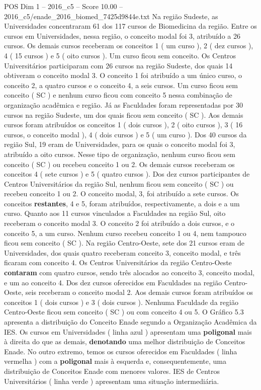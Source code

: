 \begin{textsample}{POS Dim 1 – 2016\_c5 – Score 10.00 – 2016\_c5/enade\_2016\_biomed\_7425d9844e.txt}
Na região Sudeste, as Universidades concentraram 61 dos 117 cursos de Biomedicina da região.
Entre os cursos em Universidades, nessa região, o conceito modal foi 3, atribuído a 26 cursos.
Os demais cursos receberam os conceitos 1 ( um curso ), 2 ( dez cursos ), 4 ( 15 cursos ) e 5 ( oito cursos ).
Um curso ficou sem conceito.
Os Centros Universitários participaram com 26 cursos na região Sudeste, dos quais 14 obtiveram o conceito modal 3.
O conceito 1 foi atribuído a um único curso, o conceito 2, a quatro cursos e o conceito 4, a seis cursos.
Um curso ficou sem conceito ( SC ) e nenhum curso ficou com conceito 5 nessa combinação de organização acadêmica e região.
Já as Faculdades foram representadas por 30 cursos na região Sudeste, um dos quais ficou sem conceito ( SC ).
Aos demais cursos foram atribuídos os conceitos 1 ( dois cursos ), 2 ( oito cursos ), 3 ( 16 cursos, o conceito modal ), 4 ( dois cursos ) e 5 ( um curso ).
Dos 40 cursos da região Sul, 19 eram de Universidades, para os quais o conceito modal foi 3, atribuído a oito cursos.
Nesse tipo de organização, nenhum curso ficou sem conceito ( SC ) ou recebeu conceito 1 ou 2.
Os demais cursos receberam os conceitos 4 ( sete cursos ) e 5 ( quatro cursos ).
Dos dez cursos participantes de Centros Universitários da região Sul, nenhum ficou sem conceito ( SC ) ou recebeu conceito 1 ou 2.
O conceito modal, 3, foi atribuído a sete cursos.
Os conceitos \textbf{restantes}, 4 e 5, foram atribuídos, respectivamente, a dois e a um curso.
Quanto aos 11 cursos vinculados a Faculdades na região Sul, oito receberam o conceito modal 3.
O conceito 2 foi atribuído a dois cursos, e o conceito 5, a um curso.
Nenhum curso recebeu conceito 1 ou 4, nem tampouco ficou sem conceito ( SC ).
Na região Centro-Oeste, sete dos 21 cursos eram de Universidades, dos quais quatro receberam conceito 3, conceito modal, e três ficaram com conceito 4.
Os Centros Universitários da região Centro-Oeste \textbf{contaram} com quatro cursos, sendo três alocados ao conceito 3, conceito modal, e um ao conceito 4.
Dos dez cursos oferecidos em Faculdades na região Centro-Oeste, seis receberam o conceito modal 2.
Aos demais cursos foram atribuídos os conceitos 1 ( dois cursos ) e 3 ( dois cursos ).
Nenhuma Faculdade da região Centro-Oeste ficou sem conceito ( SC ) ou com conceito 4 ou 5.
O Gráfico 5.3 apresenta a distribuição do Conceito Enade segundo a Organização Acadêmica da IES.
Os cursos em Universidades ( linha azul ) apresentam uma \textbf{poligonal} mais à direita do que as demais, \textbf{denotando} uma melhor distribuição de Conceitos Enade.
No outro extremo, temos os cursos oferecidos em Faculdades ( linha vermelha ) com a \textbf{poligonal} mais à esquerda e, consequentemente, uma distribuição de Conceitos Enade com menores valores.
IES de Centros Universitários ( linha verde ) apresentam uma situação intermediária.

\end{textsample}

